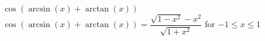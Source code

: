  {$\cos \left( \arcsin(x) + \arctan(x) \right)$ }
{ $\cos \left( \arcsin(x) + \arctan(x) \right) = \dfrac{\sqrt{1 - x^{2}} - x^{2}}{\sqrt{1 + x^{2}}}$ for $-1 \leq x \leq 1$}
